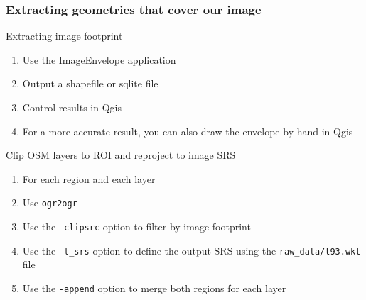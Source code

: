 \documentclass[8pt]{beamer}
\begin{document}
\begin{frame}[fragile]
\frametitle{Extracting geometries that cover our image}
\begin{block}{Extracting image footprint}
\begin{enumerate}
\item Use the ImageEnvelope application
\item Output a shapefile or sqlite file
\item Control results in Qgis
\item For a more accurate result, you can also draw the envelope by hand in Qgis
\end{enumerate}
\end{block}

\begin{block}{Clip OSM layers to ROI and reproject to image SRS}
\begin{enumerate}
\item For each region and each layer
\item Use \texttt{ogr2ogr}
\item Use the \texttt{-clipsrc} option to filter by image footprint
\item Use the \texttt{-t\_srs} option to define the output SRS using the \texttt{raw\_data/l93.wkt} file
\item Use the \texttt{-append} option to merge both regions for each layer
\end{enumerate}
\end{block}

\end{frame}
\end{document}
